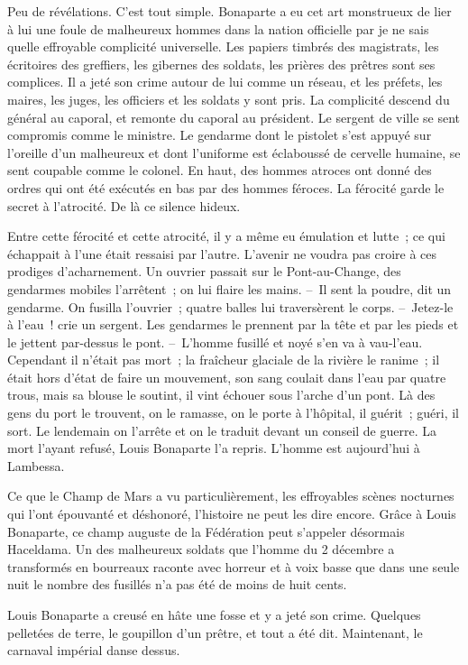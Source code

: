 \documentclass[french,twoside]{book} %
\begin{document}
Peu de révélations. C’est tout simple. Bonaparte a eu cet art monstrueux de lier à lui une foule de malheureux hommes dans la nation officielle par je ne sais quelle effroyable complicité universelle. Les papiers timbrés des magistrats, les écritoires des greffiers, les gibernes des soldats, les prières des prêtres sont ses complices. Il a jeté son crime autour de lui comme un réseau, et les préfets, les maires, les juges, les officiers et les soldats y sont pris. La complicité descend du général au caporal, et remonte du caporal au président. Le sergent de ville se sent compromis comme le ministre. Le gendarme dont le pistolet s’est appuyé sur l’oreille d’un malheureux et dont l’uniforme est éclaboussé de cervelle humaine, se sent coupable comme le colonel. En haut, des hommes atroces ont donné des ordres qui ont été exécutés en bas par des hommes féroces. La férocité garde le secret à l’atrocité. De là ce silence hideux.\par
Entre cette férocité et cette atrocité, il y a même eu émulation et lutte ; ce qui échappait à l’une était ressaisi par l’autre. L’avenir ne voudra pas croire à ces prodiges d’acharnement. Un ouvrier passait sur le Pont-au-Change, des gendarmes mobiles l’arrêtent ; on lui flaire les mains. – Il sent la poudre, dit un gendarme. On fusilla l’ouvrier ; quatre balles lui traversèrent le corps. – Jetez-le à l’eau ! crie un sergent. Les gendarmes le prennent par la tête et par les pieds et le jettent par-dessus le pont. – L’homme fusillé et noyé s’en va à vau-l’eau. Cependant il n’était pas mort ; la fraîcheur glaciale de la rivière le ranime ; il était hors d’état de faire un mouvement, son sang coulait dans l’eau par quatre trous, mais sa blouse le soutint, il vint échouer sous l’arche d’un pont. Là des gens du port le trouvent, on le ramasse, on le porte à l’hôpital, il guérit ; guéri, il sort. Le lendemain on l’arrête et on le traduit devant un conseil de guerre. La mort l’ayant refusé, Louis Bonaparte l’a repris. L’homme est aujourd’hui à Lambessa.\par
Ce que le Champ de Mars a vu particulièrement, les effroyables scènes nocturnes qui l’ont épouvanté et déshonoré, l’histoire ne peut les dire encore. Grâce à Louis Bonaparte, ce champ auguste de la Fédération peut s’appeler désormais Haceldama. Un des malheureux soldats que l’homme du 2 décembre a transformés en bourreaux raconte avec horreur et à voix basse que dans une seule nuit le nombre des fusillés n’a pas été de moins de huit cents.\par
Louis Bonaparte a creusé en hâte une fosse et y a jeté son crime. Quelques pelletées de terre, le goupillon d’un prêtre, et tout a été dit. Maintenant, le carnaval impérial danse dessus.\par
\end{document}
